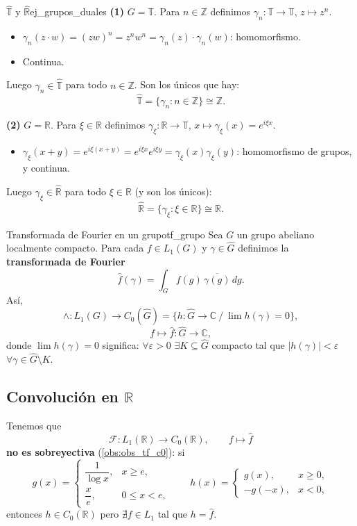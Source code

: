 \begin{ejemplo}{$\hat{\mathbb{T}}$ y $\hat{\mathbb{R}}$}{ej_grupos_duales}
\textbf{(1)} $G = \mathbb{T}$. Para $n \in \mathbb{Z}$ definimos $\gamma_n : \mathbb{T} \to \mathbb{T}$, $z \mapsto z^n$.
\begin{itemize}
\item $\gamma_n(z\cdot w) = (zw)^n = z^nw^n = \gamma_n(z)\cdot\gamma_n(w)$: homomorfismo.
\item Continua.
\end{itemize}
Luego $\gamma_n \in \hat{\mathbb{T}}$ para todo $n \in \mathbb{Z}$. Son los únicos que hay:
\[
\hat{\mathbb{T}} = \{\gamma_n : n \in \mathbb{Z}\} \cong \mathbb{Z}.
\]

\textbf{(2)} $G = \mathbb{R}$. Para $\xi \in \mathbb{R}$ definimos $\gamma_\xi : \mathbb{R} \to \mathbb{T}$, $x \mapsto \gamma_\xi(x) = e^{i\xi x}$.
\begin{itemize}
\item $\gamma_\xi(x + y) = e^{i\xi(x+y)} = e^{i\xi x}e^{i\xi y} = \gamma_\xi(x)\gamma_\xi(y)$: homomorfismo de grupos, y continua.
\end{itemize}
Luego $\gamma_\xi \in \hat{\mathbb{R}}$ para todo $\xi \in \mathbb{R}$ (y son los únicos):
\[
\hat{\mathbb{R}} = \{\gamma_\xi : \xi \in \mathbb{R}\} \cong \mathbb{R}.
\]
\end{ejemplo}

\begin{definicion}{Transformada de Fourier en un grupo}{tf_grupo}
Sea $G$ un grupo abeliano localmente compacto. Para cada $f \in L_1(G)$ y $\gamma \in \hat{G}$ definimos la \textbf{transformada de Fourier}
\[
\hat{f}(\gamma) = \int_G f(g)\,\overline{\gamma(g)}\,dg.
\]
Así,
\[
\wedge : L_1(G) \longrightarrow C_0(\hat{G}) = \Big\{h : \hat{G} \to \mathbb{C} \ \Big/\ \lim h(\gamma) = 0\Big\},
\]
\[
f \longmapsto \hat{f} : \hat{G} \to \mathbb{C},
\]
donde $\lim h(\gamma) = 0$ significa: $\forall\varepsilon > 0$ $\exists K \subseteq \hat{G}$ compacto tal que $|h(\gamma)| < \varepsilon$ $\forall\gamma \in \hat{G} \setminus K$.
\end{definicion}

\subsection{Convolución en \texorpdfstring{$\mathbb{R}$}{R}}

Tenemos que
\[
\mathcal{F} : L_1(\mathbb{R}) \longrightarrow C_0(\mathbb{R}), \qquad f \longmapsto \hat{f}
\]
\textbf{no es sobreyectiva} (\cref{obs:obs_tf_c0}): si
\[
g(x) = \begin{cases} \dfrac{1}{\log x}, & x \ge e, \\[6pt] \dfrac{x}{e}, & 0 \le x < e, \end{cases} \qquad h(x) = \begin{cases} g(x), & x \ge 0, \\ -g(-x), & x < 0, \end{cases}
\]
entonces $h \in C_0(\mathbb{R})$ pero $\nexists f \in L_1$ tal que $h = \hat{f}$.

